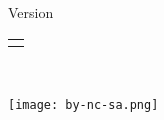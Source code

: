 
\thispagestyle{empty}
	
	\begin{center}
		\makeatletter
		{\bf {\Huge \@title}}
		\\[1cm]
		{\large \subtitlename}\\[3cm]
		{\bf {\Large \subsubtitlename}}\\[4cm]
		\@date\\[2cm]
		{\footnotesize Version \revname}
		\\[5cm]
		\begin{tabular}[t]{c} \@author \end{tabular}\\[3cm]
		\makeatother
		
		\begin{center}
			\texttt{[image: by-nc-sa.png]}
		\end{center}
	\end{center}

\cleardoublepage


